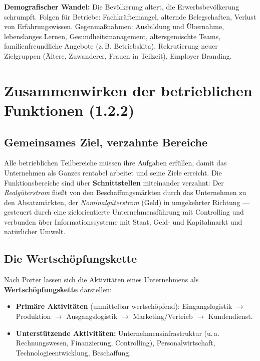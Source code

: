 \documentclass[11pt, a4paper]{article}
\begin{document}
\begin{beispiel}
\textbf{Demografischer Wandel:} Die Bevölkerung altert, die Erwerbsbevölkerung schrumpft.
Folgen für Betriebe: Fachkräftemangel, alternde Belegschaften, Verlust von Erfahrungswissen.
Gegenmaßnahmen: Ausbildung und Übernahme, lebenslanges Lernen, Gesundheitsmanagement,
altersgemischte Teams, familienfreundliche Angebote (z.\,B. Betriebskita), Rekrutierung
neuer Zielgruppen (Ältere, Zuwanderer, Frauen in Teilzeit), Employer Branding.
\end{beispiel}

\section{Zusammenwirken der betrieblichen Funktionen (1.2.2)}

\subsection{Gemeinsames Ziel, verzahnte Bereiche}

Alle betrieblichen Teilbereiche müssen ihre Aufgaben erfüllen, damit das Unternehmen als
Ganzes rentabel arbeitet und seine Ziele erreicht. Die Funktionsbereiche sind über
\textbf{Schnittstellen} miteinander verzahnt: Der \emph{Realgüterstrom} fließt von den
Beschaffungsmärkten durch das Unternehmen zu den Absatzmärkten, der
\emph{Nominalgüterstrom} (Geld) in umgekehrter Richtung --- gesteuert durch eine
zielorientierte Unternehmensführung mit Controlling und verbunden über
Informationssysteme mit Staat, Geld- und Kapitalmarkt und natürlicher Umwelt.

\subsection{Die Wertschöpfungskette}

Nach Porter lassen sich die Aktivitäten eines Unternehmens als
\textbf{Wertschöpfungskette} darstellen:
\begin{itemize}
  \item \textbf{Primäre Aktivitäten} (unmittelbar wertschöpfend): Eingangslogistik
    $\rightarrow$ Produktion $\rightarrow$ Ausgangslogistik $\rightarrow$
    Marketing/Vertrieb $\rightarrow$ Kundendienst.
  \item \textbf{Unterstützende Aktivitäten:} Unternehmensinfrastruktur (u.\,a.
    Rechnungswesen, Finanzierung, Controlling), Personalwirtschaft, Technologieentwicklung,
    Beschaffung.
\end{itemize}
\end{document}
